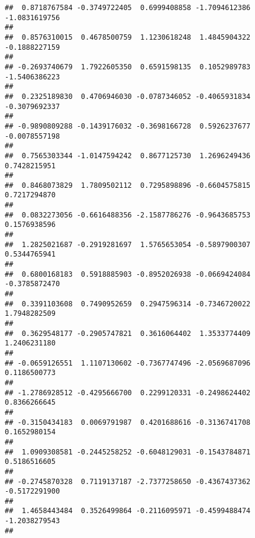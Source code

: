 \documentclass[]{article}
\begin{document}
\begin{verbatim}
##  0.8718767584 -0.3749722405  0.6999408858 -1.7094612386 -1.0831619756 
##                                                                       
##  0.8576310015  0.4678500759  1.1230618248  1.4845904322 -0.1888227159 
##                                                                       
## -0.2693740679  1.7922605350  0.6591598135  0.1052989783 -1.5406386223 
##                                                                       
##  0.2325189830  0.4706946030 -0.0787346052 -0.4065931834 -0.3079692337 
##                                                                       
## -0.9890809288 -0.1439176032 -0.3698166728  0.5926237677 -0.0078557198 
##                                                                       
##  0.7565303344 -1.0147594242  0.8677125730  1.2696249436  0.7428215951 
##                                                                       
##  0.8468073829  1.7809502112  0.7295898896 -0.6604575815  0.7217294870 
##                                                                       
##  0.0832273056 -0.6616488356 -2.1587786276 -0.9643685753  0.1576938596 
##                                                                       
##  1.2825021687 -0.2919281697  1.5765653054 -0.5897900307  0.5344765941 
##                                                                       
##  0.6800168183  0.5918885903 -0.8952026938 -0.0669424084 -0.3785872470 
##                                                                       
##  0.3391103608  0.7490952659  0.2947596314 -0.7346720022  1.7948282509 
##                                                                       
##  0.3629548177 -0.2905747821  0.3616064402  1.3533774409  1.2406231180 
##                                                                       
## -0.0659126551  1.1107130602 -0.7367747496 -2.0569687096  0.1186500773 
##                                                                       
## -1.2786928512 -0.4295666700  0.2299120331 -0.2498624402  0.8366266645 
##                                                                       
## -0.3150434183  0.0069791987  0.4201688616 -0.3136741708  0.1652980154 
##                                                                       
##  1.0909308581 -0.2445258252 -0.6048129031 -0.1543784871  0.5186516605 
##                                                                       
## -0.2745870328  0.7119137187 -2.7377258650 -0.4367437362 -0.5172291900 
##                                                                       
##  1.4658443484  0.3526499864 -0.2116095971 -0.4599488474 -1.2038279543 
##                                                                       

\end{verbatim}
\end{document}
